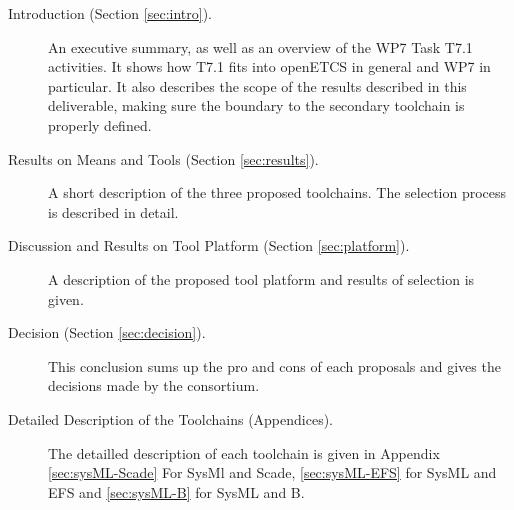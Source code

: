 \begin{description}
\item[Introduction (Section \ref{sec:intro}).] An executive summary, as well as an overview of the WP7 Task T7.1 activities.  It shows how T7.1 fits into openETCS in general and WP7 in particular.  It also describes the scope of the results described in this deliverable, making sure the boundary to the secondary toolchain is properly defined.

\item[Results on Means and Tools (Section \ref{sec:results}).] A short description of the three proposed toolchains.  The selection process is described in detail.

\item[Discussion and Results on Tool Platform (Section \ref{sec:platform}).] A description of the proposed tool platform and results of selection is given.

\item[Decision (Section \ref{sec:decision}).] This conclusion sums up  the pro and cons of each proposals and gives the decisions made by the consortium.

\item[Detailed Description of the Toolchains (Appendices).] The detailled description of each toolchain is given in Appendix \ref{sec:sysML-Scade} For SysMl and Scade, \ref{sec:sysML-EFS} for SysML and EFS and \ref{sec:sysML-B} for SysML and B.


\end{description}





